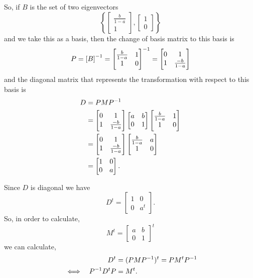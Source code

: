 \documentclass[MathsNotesBase.tex]{subfiles}
\begin{document}
{		
		\bigskip
		So, if $B$ is the set of two eigenvectors
		\[ \left\{ \begin{bmatrix}\frac{b}{1 - a}\\1\end{bmatrix}, \begin{bmatrix}1\\0\end{bmatrix} \right\} \]
		and we take this as a basis, then the change of basis matrix to this basis is
		\[ P = {[B]}^{-1} = {\begin{bmatrix}\frac{b}{1 - a} & 1\\1 & 0\end{bmatrix}}^{-1} 
			= \begin{bmatrix}0 & 1\\1 & \frac{-b}{1 - a}\end{bmatrix} 
		\]
		and the diagonal matrix that represents the transformation with respect to this basis is
		\begin{align*}
		D &= PM{P}^{-1} \\
		&= \begin{bmatrix}0 & 1\\1 & \frac{-b}{1 - a}\end{bmatrix}
		\begin{bmatrix}
		a & b\\
		0 & 1
		\end{bmatrix}
		\begin{bmatrix}\frac{b}{1 - a} & 1\\1 & 0\end{bmatrix}\\
		&= \begin{bmatrix}0 & 1\\1 & \frac{-b}{1 - a}\end{bmatrix}
		\begin{bmatrix}\frac{b}{1 - a} & a\\1 & 0\end{bmatrix}\\
		&= \begin{bmatrix}1 & 0\\0 & a\end{bmatrix}.
		\end{align*}

		Since $D$ is diagonal we have
		\[ {D}^t = \begin{bmatrix}1 & 0\\0 & a^t\end{bmatrix}. \]
		So, in order to calculate,
		\[ M^t = \begin{bmatrix}
					a & b\\
					0 & 1
				 \end{bmatrix}^t
		 \]
		 we can calculate,
		 \begin{align*}
		 && {D}^t &= (PM{P}^{-1})^t = PM^t{P}^{-1} \\
		 &\iff & {P}^{-1}{D}^tP &= M^t. \\
		 \end{align*}
		 
}
\end{document}
